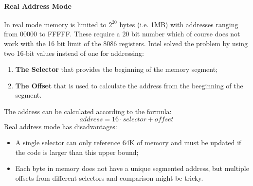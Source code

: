\documentclass[paper=a4, fontsize=11pt]{report} %
\numberwithin{equation}{section} %
\numberwithin{figure}{section} %
\numberwithin{table}{section} %
\begin{document}
\paragraph{Real Address Mode}
In real mode memory is limited to $2^{20}$ bytes (i.e. 1MB) with addresses 
ranging from 00000 to FFFFF. These require a 20 bit number which of course does
not work with the 16 bit limit of the 8086 registers. Intel solved the problem
by using two 16-bit values instead of one for addressing:
\begin{enumerate}
\item \textbf{The Selector} that provides the beginning of the memory segment;
\item \textbf{The Offset} that is used to calculate the address from the
  beeginning of the segment.
\end{enumerate}
The address can be calculated according to the formula:
\begin{equation}
  address = 16 \cdot selector + offset
\end{equation}
Real address mode has disadvantages:
\begin{itemize}
  \item A single selector can only reference 64K of memory and must be updated
    if the code is larger than this upper bound;
  \item Each byte in memory does not have a unique segmented address, but
    multiple offsets from different selectors and comparison might be tricky.
\end{itemize}
\end{document}
